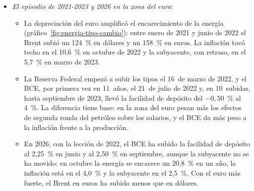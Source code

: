 \documentclass[11pt]{article}
\begin{document}
\begin{itemize}
\item \emph{El episodio de 2021-2023 y 2026 en la zona del euro}:
  \begin{itemize}
  \item La depreciación del euro amplificó el encarecimiento de la energía (gráfico~\ref{fig:energia-tipo-cambio}): entre enero de 2021 y junio de 2022 el Brent subió un 124~\% en dólares y un 158~\% en euros. La inflación tocó techo en el 10,6~\% en octubre de 2022 y la subyacente, con retraso, en el 5,7~\% en marzo de 2023\nocite{Eurostat2026IAPC}.
  \item La Reserva Federal empezó a subir los tipos el 16~de marzo de 2022\nocite{Fed2022FOMCMarzo}, y el BCE, por primera vez en 11~años, el 21~de julio de 2022 y, en 10~subidas, hasta septiembre de 2023, llevó la facilidad de depósito del $-0{,}50$~\% al 4~\%\nocite{BCE2022DecisionesJulio,BCE2026TiposOficiales}. La diferencia tiene base: en la zona del euro pesan más los efectos de segunda ronda del petróleo sobre los salarios, y el BCE da más peso a la inflación frente a la producción\nocite{PeersmanVanRobays2009}.
  \item En 2026, con la lección de 2022, el BCE ha subido la facilidad de depósito al 2,25~\% en junio y al 2,50~\% en septiembre, aunque la subyacente no se ha movido: en octubre la energía se encarece un 20,8~\% en un año, la inflación está en el 4,0~\% y la subyacente en el 2,5~\%\nocite{BCE2026TiposOficiales,Eurostat2026IAPCoct}. Con el euro más fuerte, el Brent en euros ha subido menos que en dólares.
  \end{itemize}
\end{itemize}
\end{document}
